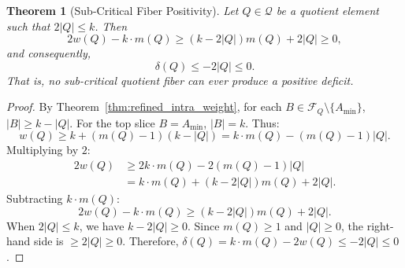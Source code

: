 \documentclass[11pt,a4paper]{article}
\theoremstyle{plain}
\newtheorem{theorem}{Theorem}[section]
\theoremstyle{definition}
\theoremstyle{remark}
\newcommand{\F}{\mathcal{F}}
\newcommand{\Q}{\mathcal{Q}}
\begin{document}
\begin{theorem}[Sub-Critical Fiber Positivity]\label{thm:subcritical_pos}
Let $Q \in \Q$ be a quotient element such that $2 |Q| \le k$. Then
\begin{equation}
2 w(Q) - k \cdot m(Q) \ge (k - 2|Q|)m(Q) + 2|Q| \ge 0,
\end{equation}
and consequently,
\begin{equation}
\delta(Q) \le -2|Q| \le 0.
\end{equation}
That is, no sub-critical quotient fiber can ever produce a positive deficit.
\end{theorem}
\begin{proof}
By Theorem~\ref{thm:refined_intra_weight}, for each $B \in \F_Q \setminus \{A_{\min}\}$, $|B| \ge k - |Q|$. For the top slice $B = A_{\min}$, $|B| = k$. Thus:
\begin{equation}
w(Q) \ge k + (m(Q) - 1)(k - |Q|) = k \cdot m(Q) - (m(Q) - 1)|Q|.
\end{equation}
Multiplying by $2$:
\begin{align}
2 w(Q) &\ge 2 k \cdot m(Q) - 2(m(Q) - 1)|Q| \nonumber \\
&= k \cdot m(Q) + (k - 2|Q|)m(Q) + 2|Q|.
\end{align}
Subtracting $k \cdot m(Q)$:
\begin{equation}
2 w(Q) - k \cdot m(Q) \ge (k - 2|Q|)m(Q) + 2|Q|.
\end{equation}
When $2|Q| \le k$, we have $k - 2|Q| \ge 0$. Since $m(Q) \ge 1$ and $|Q| \ge 0$, the right-hand side is $\ge 2|Q| \ge 0$. Therefore, $\delta(Q) = k \cdot m(Q) - 2 w(Q) \le -2|Q| \le 0$.
\end{proof}
\end{document}
